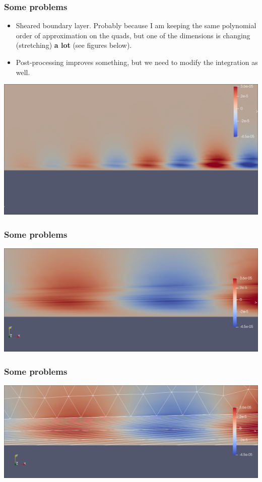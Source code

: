 \documentclass[
	aspectratio=169, %
	t, %
	onlytextwidth, %
	10pt, %
]{beamer}
\begin{document}
\begin{frame}
	\frametitle{Some problems}

	\begin{itemize}
		\item Sheared boundary layer. Probably because I am keeping the same polynomial order of approximation on the quads, but one of the dimensions is changing (stretching) \textbf{a lot} (see figures below).
		\item Post-processing improves something, but we need to modify the integration as well.
	\end{itemize}
	
	{
	\centering
	\includegraphics[width=\linewidth]{Images/shear_nozoom.png}
	}


\end{frame}
\begin{frame}
	\frametitle{Some problems}
	
	{
	\centering
	\includegraphics[width=\linewidth]{Images/shear.png}
	}
\end{frame}
\begin{frame}
	\frametitle{Some problems}
	
	{
	\centering
	\includegraphics[width=\linewidth]{Images/shear_mesh.png}
	}
\end{frame}
\end{document}
